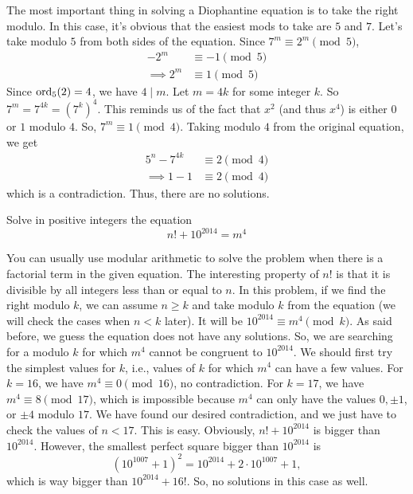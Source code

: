 \documentclass{subfile}
\begin{document}
				\begin{solution}
					The most important thing in solving a Diophantine equation is to take the right modulo. In this case, it's obvious that the easiest mods to take are $5$ and $7$. Let's take modulo $5$ from both sides of the equation. Since $7^m \equiv 2^m \pmod 5$,
						\begin{align*}
							-2^m
								& \equiv -1 \pmod 5\\
							\implies 2^m
								& \equiv 1 \pmod 5
						\end{align*}
					Since $\operatorname{ord}_5(2)=4$, we have $4 \mid m$. Let $m=4k$ for some integer $k$. So $7^m = 7^{4k}=\left(7^k\right)^4$. This reminds us of the fact that $x^2$ (and thus $x^4$) is either $0$ or $1$ modulo $4$. So, $7^m \equiv 1 \pmod 4$. Taking modulo $4$ from the original equation, we get
						\begin{align*}
							5^n - 7^{4k}
								& \equiv 2 \pmod 4\\
							\implies 1-1
								& \equiv 2 \pmod 4
						\end{align*}
					which is a contradiction. Thus, there are no solutions.
				\end{solution}

				\begin{problem}[Kazakhstan 2016]
					Solve in positive integers the equation
					\[n!+10^{2014}=m^4\]
				\end{problem}

				\begin{solution}
					You can usually use modular arithmetic to solve the problem when there is a factorial term in the given equation. The interesting property of $n!$ is that it is divisible by all integers less than or equal to $n$. In this problem, if we find the right modulo $k$, we can assume $n\geq k$ and take modulo $k$ from the equation (we will check the cases when $n < k$ later). It will be $10^{2014} \equiv m^4 \pmod k$. As said before, we guess the equation does not have any solutions. So, we are searching for a modulo $k$ for which $m^4$ cannot be congruent to $10^{2014}$. We should first try the simplest values for $k$, i.e., values of $k$ for which $m^4$ can have a few values. For $k=16$, we have $m^4 \equiv 0 \pmod{16}$, no contradiction. For $k=17$, we have $m^4 \equiv 8 \pmod{17}$, which is impossible because $m^4$ can only have the values $0, \pm 1$, or $\pm 4$ modulo $17$. We have found our desired contradiction, and we just have to check the values of $n < 17$. This is easy. Obviously, $n! + 10^{2014}$ is bigger than $10^{2014}$. However, the smallest perfect square bigger than $10^{2014}$ is \[\left(10^{1007}+1\right)^2 = 10^{2014} + 2 \cdot 10^{1007} + 1,\]
					which is way bigger than $10^{2014} + 16!$. So, no solutions in this case as well.
				\end{solution}
\end{document}
